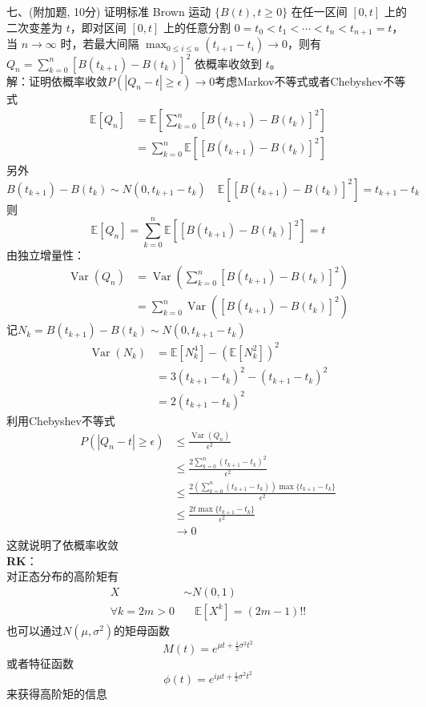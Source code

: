\documentclass[UTF8,openany]{book}
\begin{document}
\noindent 七、(附加题, 10分) 证明标准 Brown 运动 $\{B(t), t \geq 0\}$ 在任一区间 $[0,t]$ 上的二次变差为 $t$，即对区间 $[0,t]$ 上的任意分割 $0 = t_0 < t_1 < \cdots < t_n < t_{n+1} = t$，当 $n \to \infty$ 时，若最大间隔 $\max_{0 \leq i \leq n}(t_{i+1} - t_i) \to 0$，则有 $Q_n = \sum_{k=0}^n [B(t_{k+1}) - B(t_k)]^2$ 依概率收敛到 $t$。\\
解：证明依概率收敛$P(|Q_n-t|\ge \epsilon)\rightarrow0$考虑Markov不等式或者Chebyshev不等式\\
$$
\begin{aligned}
	\mathbb{E}[Q_n] & =\mathbb{E}\left[\sum_{k=0}^n [B(t_{k+1}) - B(t_k)]^2 \right]  \\
	& =\sum_{k=0}^n \mathbb{E}\left[ [B(t_{k+1}) - B(t_k)]^2\right] 
\end{aligned}
$$
另外
\[
B(t_{k+1})-B(t_k) \sim N(0,t_{k+1}-t_k) \quad \mathbb{E}\left[ [B(t_{k+1}) - B(t_k)]^2\right] =t_{k+1}-t_k
\]
则
\[
\mathbb{E}[Q_n]=\sum_{k=0}^n \mathbb{E}\left[ [B(t_{k+1}) - B(t_k)]^2\right] =t
\]
由独立增量性：
$$
\begin{aligned}
	\operatorname{Var}(Q_n) & =\operatorname{Var}\left(\sum_{k=0}^n [B(t_{k+1}) - B(t_k)]^2 \right)  \\
	& =\sum_{k=0}^n \operatorname{Var}\left( [B(t_{k+1}) - B(t_k)]^2\right)
\end{aligned}
$$
记$N_k=B(t_{k+1})-B(t_k) \sim N(0,t_{k+1}-t_k)$\\
$$
\begin{aligned}
	\operatorname{Var}(N_k)&=\mathbb{E}[N_k^4]-\left(\mathbb{E}[N_k^2] \right)^2\\
	& =3(t_{k+1}-t_k)^2-(t_{k+1}-t_k)^2\\
	& =2(t_{k+1}-t_k)^2
\end{aligned}
$$
利用Chebyshev不等式\\
$$
\begin{aligned}
	P(|Q_n-t|\ge \epsilon)&\le \frac{\operatorname{Var}(Q_n)}{\epsilon^2}\\
	&\le \frac{2\sum_{k=0}^n(t_{k+1}-t_k)^2}{\epsilon^2}\\
	&\le \frac{2\left( \sum_{k=0}^n(t_{k+1}-t_k)\right)\max\{
		t_{k+1}-t_k\}}{\epsilon^2}\\
	&\le \frac{2t\max\{
		t_{k+1}-t_k\}}{\epsilon^2}\\
	&\rightarrow 0
\end{aligned}
$$
这就说明了依概率收敛\\
\textbf{RK}：\\
对正态分布的高阶矩有
$$
\begin{aligned}
	X &\sim N(0,1)\\
	\forall k=2m>0&\quad \mathbb{E}[X^k]=(2m-1)!!
\end{aligned}
$$
也可以通过$N(\mu,\sigma^2)$的矩母函数$$M(t)=e^{\mu t+\frac{1}{2}\sigma^2t^2}$$或者特征函数$$\phi(t)=e^{i\mu t+\frac{1}{2}\sigma^2t^2}$$来获得高阶矩的信息\\
\newpage
\end{document}
